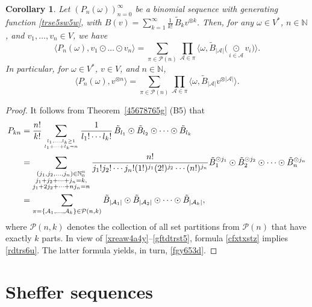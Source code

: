 \documentclass[12pt]{article}
\newtheorem{corollary}[theorem]{Corollary}
\theoremstyle{remark}
\theoremstyle{remark}
\theoremstyle{remark}
\begin{document}
\begin{corollary}\label{cxtsxtstst} Let  $(P_n(\omega))_{n=0}^\infty$ be a binomial sequence with generating function \eqref{trse5sw5w}, with $B(v)=\sum_{k=1}^\infty\frac1{k!}\,\tilde B_kv^{\otimes k}$.  Then, for any $\omega\in V^*$,  $n\in\mathbb N$, and $v_1,\dots,v_n\in V$, we have
\begin{equation}\label{fgy653d}
\langle P_n(\omega),v_1\odot\dots\odot v_n\rangle=
\sum_{\pi\in\mathcal P(n)}\prod_{\mathcal A\in\pi}\Big\langle\omega,\tilde B_{|\mathcal A|}\Big(\underset{i\in \mathcal A}\odot v_i\Big)\Big\rangle.\end{equation}
In particular, for $\omega\in V^*$, $v\in V$, and $n\in\mathbb N$,
\begin{equation}\label{rdtrs6u}
\langle P_n(\omega),v^{\otimes n}\rangle=
\sum_{\pi\in\mathcal P(n)}\prod_{\mathcal A\in\pi}\langle\omega,\tilde B_{|\mathcal A|}v^{\otimes|\mathcal A|}\rangle.\end{equation}
  \end{corollary}
  
  \begin{proof}It follows from Theorem~\ref{45678765g} (B5) that
  \begin{align}P_{kn}&=\frac{n!}{k!}\sum_{l_1,\dots,l_k\geq 1\atop l_1+\cdots+l_k=n}\frac{1}{l_1!\cdots l_k!}\,\tilde B_{l_1}\odot\tilde B_{l_2}\odot\dots \odot\tilde B_{l_k}\notag\\
&=\sum_{\substack{(j_1,j_2,\dots,j_n)\in \mathbb {N}_0^n\\ j_1+j_2+\cdots+j_n=k,\\ j_1+2j_2+\cdots+nj_n=n}}\frac{n!}{j_1!j_2!\cdots j_n!(1!)^{j_1}(2!)^{j_2}\cdots(n!)^{j_n}}\tilde B_1^{\odot j_1}\odot\tilde B_2^{\odot j_2}\odot\dots \odot\tilde B_n^{\odot j_n}\notag\\
&=\sum_{\pi=\{\mathcal A_1,\dots,\mathcal A_k\}\in\mathcal P(n,k)}\tilde B_{|\mathcal A_1|}\odot\tilde B_{|\mathcal A_2|}\odot\cdots \odot \tilde B_{|\mathcal A_k|},\label{cfxtxstz}\end{align}
where $\mathcal P(n,k)$ denotes the collection of all set partitions  from $\mathcal P(n)$
 that have exactly $k$ parts. 
In view of \eqref{xreaw4a4y}--\eqref{gftdtrst5}, formula \eqref{cfxtxstz} implies \eqref{rdtrs6u}. The latter formula yields, in turn, \eqref{fgy653d}.  
  \end{proof}
  
  
 \section{Sheffer sequences}\label{cxzsrarewtytyrf}
\end{document}
